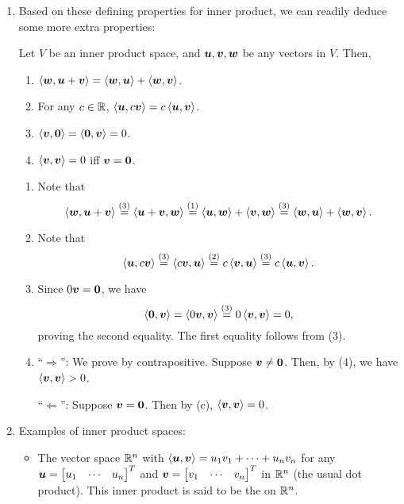 \begin{enumerate}
\item Based on these defining properties for inner product, we can readily
deduce some more extra properties:
\begin{proposition}
\label{prp:in-prod-prop}
Let \(V\) be an inner product space, and \(\vb*{u},\vb*{v},\vb*{w}\) be any
vectors in \(V\). Then,
\begin{enumerate}
\item \(\left\langle \vb*{w},\vb*{u}+\vb*{v}\right\rangle=\left\langle \vb*{w},\vb*{u}\right\rangle+\left\langle \vb*{w},\vb*{v}\right\rangle\).
\item For any \(c\in\mathbb{R}\),
\(\left\langle \vb*{u},c\vb*{v}\right\rangle=c\left\langle \vb*{u},\vb*{v}\right\rangle\).
\item \(\left\langle \vb*{v},\vb*{0}\right\rangle=\left\langle \vb*{0},\vb*{v}\right\rangle=0\).
\item \(\left\langle \vb*{v},\vb*{v}\right\rangle=0\) iff \(\vb*{v}=\vb*{0}\).
\end{enumerate}
\end{proposition}
\begin{pf}
\begin{enumerate}
\item Note that
\[
\left\langle \vb*{w},\vb*{u}+\vb*{v}\right\rangle
\overset{\text{(3)}}{=}\left\langle \vb*{u}+\vb*{v},\vb*{w}\right\rangle
\overset{\text{(1)}}{=}\left\langle \vb*{u},\vb*{w}\right\rangle+\left\langle \vb*{v},\vb*{w}\right\rangle
\overset{\text{(3)}}{=}\left\langle \vb*{w},\vb*{u}\right\rangle+\left\langle \vb*{w},\vb*{v}\right\rangle.
\]
\item Note that
\[
\left\langle \vb*{u},c\vb*{v}\right\rangle
\overset{\text{(3)}}{=}\left\langle c\vb*{v},\vb*{u}\right\rangle
\overset{\text{(2)}}{=}c\left\langle \vb*{v},\vb*{u}\right\rangle
\overset{\text{(3)}}{=}c\left\langle \vb*{u},\vb*{v}\right\rangle.
\]
\item Since \(0\vb*{v}=\vb*{0}\), we have
\[
\left\langle \vb*{0},\vb*{v}\right\rangle
=\left\langle 0\vb*{v},\vb*{v}\right\rangle
\overset{\text{(3)}}{=}0\left\langle \vb*{v},\vb*{v}\right\rangle
=0,
\]
proving the second equality. The first equality follows from (3).

\item ``\(\Rightarrow\)'': We prove by contrapositive. Suppose
\(\vb*{v}\ne\vb*{0}\). Then, by (4), we have
\(\left\langle \vb*{v},\vb*{v}\right\rangle>0\).

``\(\Leftarrow\)'': Suppose \(\vb*{v}=\vb*{0}\). Then by (c),
\(\left\langle \vb*{v},\vb*{v}\right\rangle=0\).
\end{enumerate}
\end{pf}

\item Examples of inner product spaces:
\begin{itemize}
\item The vector space \(\mathbb{R}^n\) with \(\left\langle \vb*{u},\vb*{v}\right\rangle=u_1v_1+\dotsb+u_nv_n\)
for any \(\vect{u}=\mqty[u_1&\cdots&u_n]^{T}\) and
\(\vect{v}=\mqty[v_1&\cdots&v_n]^{T}\) in \(\mathbb{R}^n\) (the usual dot product).
This inner product is said to be the  on \(\mathbb{R}^n\).


\end{itemize}
\end{enumerate}
